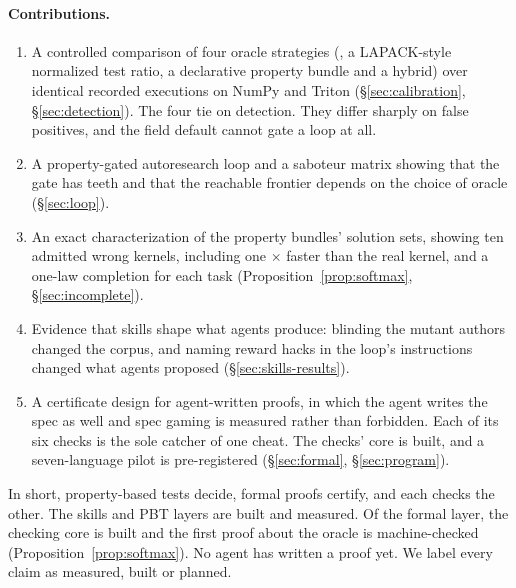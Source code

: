 \paragraph{Contributions.}
\begin{enumerate}
  \item A controlled comparison of four oracle strategies (\allclose, a
    LAPACK-style normalized test ratio, a declarative property bundle and a hybrid)
    over identical recorded executions on NumPy and Triton (\S\ref{sec:calibration},
    \S\ref{sec:detection}). The four tie on detection. They differ sharply on false
    positives, and the field default cannot gate a loop at all.
  \item A property-gated autoresearch loop and a saboteur matrix showing that the gate
    has teeth and that the reachable frontier depends on the choice of oracle
    (\S\ref{sec:loop}).
  \item An exact characterization of the property bundles' solution sets, showing ten
    admitted wrong kernels, including one \fillSpeedup$\times$ faster than the real
    kernel, and a one-law completion for each task (Proposition~\ref{prop:softmax},
    \S\ref{sec:incomplete}).
  \item Evidence that skills shape what agents produce: blinding the mutant authors changed
    the corpus, and naming reward hacks in the loop's instructions changed what agents
    proposed (\S\ref{sec:skills-results}).
  \item A certificate design for agent-written proofs, in which the agent writes the spec
    as well and spec gaming is measured rather than forbidden. Each of its six checks is
    the sole catcher of one cheat. The checks' core is built, and a seven-language pilot is
    pre-registered (\S\ref{sec:formal}, \S\ref{sec:program}).
\end{enumerate}

In short, property-based tests decide, formal proofs certify, and each checks the
other. The skills and PBT layers are built and measured. Of the formal layer, the
checking core is built and the first proof about the oracle is machine-checked
(Proposition~\ref{prop:softmax}). No agent has written a proof yet. We label every claim
as measured, built or planned.
